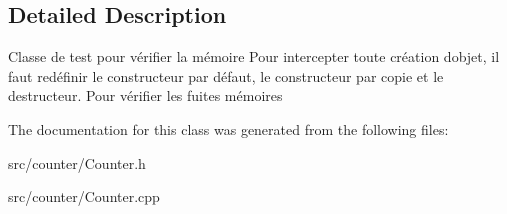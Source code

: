 \subsection{Detailed Description}
Classe de test pour vérifier la mémoire Pour intercepter toute création d\textquotesingle{}objet, il faut redéfinir le constructeur par défaut, le constructeur par copie et le destructeur. Pour vérifier les fuites mémoires 

The documentation for this class was generated from the following files\+:\begin{DoxyCompactItemize}
\item 
src/counter/Counter.\+h\item 
src/counter/Counter.\+cpp\end{DoxyCompactItemize}
